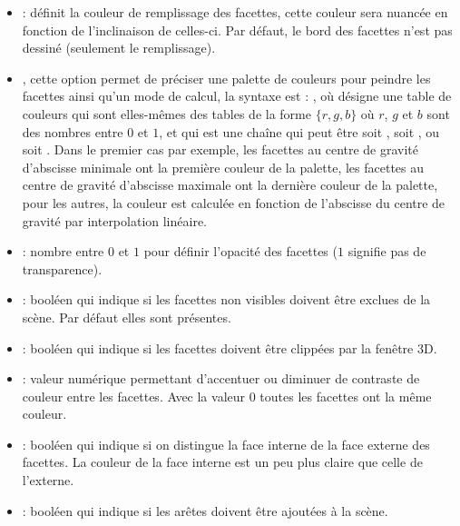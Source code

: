     \begin{itemize}
        \item {} : définit la couleur de remplissage des facettes, cette couleur sera nuancée en fonction de l'inclinaison de celles-ci. Par défaut, le bord des facettes n'est pas dessiné (seulement le remplissage).
        
        \item {}, cette option permet de préciser une palette de couleurs pour peindre les facettes ainsi qu'un mode de calcul, la syntaxe est : , où  désigne une table de couleurs qui sont elles-mêmes des tables de la forme $\{r,g,b\}$ où $r$, $g$ et $b$ sont des nombres entre $0$ et $1$, et  qui est une chaîne qui peut être soit , soit , ou soit . Dans le premier cas par exemple, les facettes au centre de gravité d'abscisse minimale ont la première couleur de la palette, les facettes au centre de gravité d'abscisse maximale ont la dernière couleur de la palette, pour les autres, la couleur est calculée en fonction de l'abscisse du centre de gravité par interpolation linéaire.
                
        \item {} : nombre entre $0$ et $1$ pour définir l'opacité des facettes ($1$ signifie pas de transparence).
        
        \item {} : booléen qui indique si les facettes non visibles doivent être exclues de la scène. Par défaut elles sont présentes.
        
        \item {} : booléen qui indique si les facettes doivent être clippées par la fenêtre 3D.
        \item {} : valeur numérique permettant d'accentuer ou diminuer de contraste de couleur entre les facettes. Avec la valeur $0$ toutes les facettes ont la même couleur.
        
        \item {} : booléen qui indique si on distingue la face interne de la face externe des facettes. La couleur de la face interne est un peu plus claire que celle de l'externe.
        
        \item {} : booléen qui indique si les arêtes doivent être ajoutées à la scène.
        

\end{itemize}
